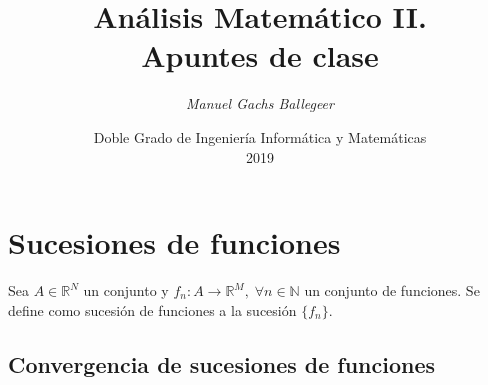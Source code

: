\documentclass[11pt,twoside,titlepage,a4paper]{article}
\theoremstyle{plain}
\theoremstyle{definition}
\theoremstyle{remark}
\begin{document}
\title{\Huge{\textbf{Análisis Matemático II.\\Apuntes de clase}}}
\author{\textit{Manuel Gachs Ballegeer}}
\date{Doble Grado de Ingeniería Informática y Matemáticas\\2019}
\maketitle

\tableofcontents
\clearpage

\section{Sucesiones de funciones}

Sea $A\in\mathbb{R}^N$ un conjunto y $f_n:A\to\mathbb{R}^M,\;\forall n\in\mathbb{N}$ un conjunto
de funciones. Se define como sucesión de funciones a la sucesión $\{f_n\}$.

\subsection{Convergencia de sucesiones de funciones}
\end{document}

